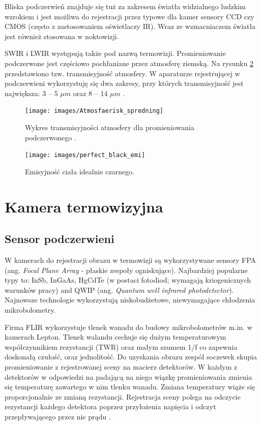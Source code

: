 Bliska podczerwień znajduje się tuż za zakresem światła widzialnego ludzkim wzrokiem i jest możliwa do rejestracji przez typowe dla kamer sensory CCD czy CMOS (często z zastosowaniem oświetlaczy IR). Wraz ze wzmacniaczem światła jest również stosowana w noktowizji.

SWIR i LWIR występują także pod nazwą termowizji. Promieniowanie podczerwone jest częściowo pochłaniane przez atmosferę ziemską. Na rysunku \ref{fig:atmosfera_int} przedstawiono tzw. transmisyjność atmosfery. W aparaturze rejestrującej w podczerwieni wykorzystuję się dwa zakresy, przy których transmisyjność jest największa: 3 -- 5 $\mu m$ oraz 8 -- 14 $\mu m$
\cite{niklaus2007mems}.


\begin{figure}
\centering
\texttt{[image: images/Atmosfaerisk\_spredning]}
\caption[Wykres transmisyjności atmosfery dla promieniowania podczerwonego ]{Wykres transmisyjności atmosfery dla promieniowania podczerwonego \cite{wiki:infrared}.}
\label{fig:perfect_black}
\end{figure}

\begin{figure}
\centering
\texttt{[image: images/perfect\_black\_emi]}
\caption[Emisyjność ciała idealnie czarnego]{Emisyjność ciała idealnie czarnego.}
\label{fig:atmosfera_int}
\end{figure}


\section{Kamera termowizyjna}

\subsection{Sensor podczerwieni}
W kamerach do rejestracji obrazu w termowizji są wykorzystywane sensory FPA (ang. \textit{Focal Plane Array} - płaskie zespoły ogniskujące). Najbardziej popularne typy to: InSb, InGaAs, HgCdTe (w postaci fotodiod; wymagają kriogenicznych warunków pracy) and QWIP (ang. \textit{ Quantum well infrared photodetector}). Najnowsze technologie wykorzystują niskobudżetowe, niewymagające chłodzenia mikrobolometry.

Firma FLIR wykorzystuje tlenek wanadu do budowy mikrobolometrów m.in. w kamerach Lepton. Tlenek walandu cechuje się dużym temperaturowym współczynnikiem rezystancji (TWR) oraz małym szumem 1/f co zapewnia doskonałą czułość, oraz jednolitość. Do uzyskania obrazu zespół soczewek skupia promieniowanie z rejestrowanej sceny na macierz detektorów. W każdym z detektorów w odpowiedzi na padającą na niego wiązkę promieniowania zmienia się temperaturę zawartego w nim tlenku wanadu. Zmiana temperatury wiąże się proporcjonalnie ze zmianą rezystancji. Rejestracja sceny polega na odczycie rezystancji każdego detektora poprzez przyłożenia napięcia i odczyt przepływającego przez nie prądu \cite{flir:lepton}.

